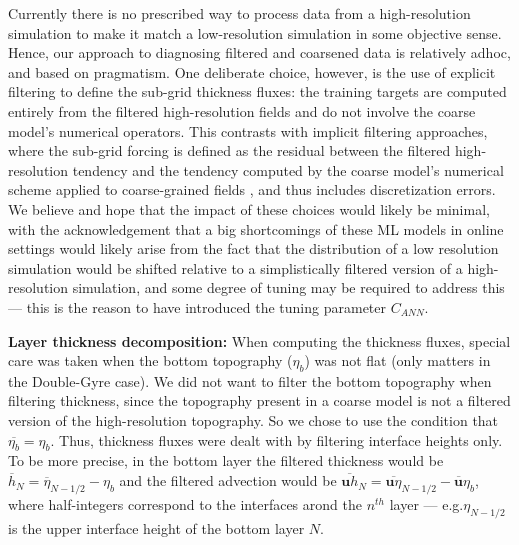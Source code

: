 \documentclass[draft]{agujournal2019}
\begin{document}
Currently there is no prescribed way to process data from a high-resolution simulation to make it match a low-resolution simulation in some objective sense. Hence, our approach to diagnosing filtered and coarsened data is relatively adhoc, and based on pragmatism. One deliberate choice, however, is the use of explicit filtering \cite{lund2003use, gullbrand2003effect} to define the sub-grid thickness fluxes: the training targets are computed entirely from the filtered high-resolution fields and do not involve the coarse model's numerical operators. This contrasts with implicit filtering approaches, where the sub-grid forcing is defined as the residual between the filtered high-resolution tendency and the tendency computed by the coarse model's numerical scheme applied to coarse-grained fields \cite{ghosal1996analysis}, and thus includes discretization errors. %
We believe and hope that the impact of these choices would likely be minimal, with the acknowledgement that a big shortcomings of these ML models in online settings would likely arise from the fact that the distribution of a low resolution simulation would be shifted relative to a simplistically filtered version of a high-resolution simulation, and some degree of tuning may be required to address this --- this is the reason to have introduced the tuning parameter $C_{ANN}$.

\textbf{Layer thickness decomposition:}
When computing the thickness fluxes, special care was taken when the bottom topography ($\eta_{b}$) was not flat (only matters in the Double-Gyre case). We did not want to filter the bottom topography when filtering thickness, since the topography present in a coarse model is not a filtered version of the high-resolution topography. So we chose to use the condition that $\overline{\eta_{b}} = \eta_{b}$.
Thus, thickness fluxes were dealt with by filtering interface heights only. To be more precise, in the bottom layer the filtered thickness would be $\overline{h}_N = \overline{\eta}_{N-1/2} - \eta_{b}$ and the filtered advection would be $\overline{\mathbf{u} h}_N = \overline{\mathbf{u} \eta}_{N-1/2} - \overline{\mathbf{u}} \eta_{b}$, where half-integers correspond to the interfaces arond the $n^{th}$ layer --- e.g.$\eta_{N-1/2}$ is the upper interface height of the bottom layer $N$.
\end{document}
